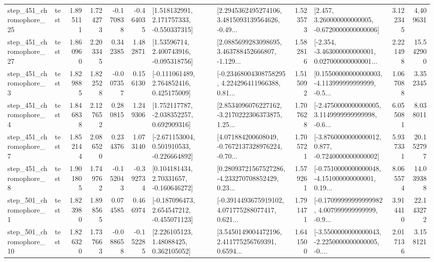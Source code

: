 \begin{tabular}{llrrrrllrlrr}
  step\_451\_chromophore\_25 &      test &      1.895111 &    1.724273 &     -0.170838 & -0.464035 &    [1.518132991, 2.171757333, -0.550337315] &  [2.2945362495274106, 3.4815093139564626, -0.49... &       1.523573 &    [2.457, 3.260000000000005, -0.6720000000000006] &            3.122345 &          4.409631 \\
  step\_451\_chromophore\_27 &      test &      1.860960 &    2.203345 &      0.342385 &  1.482871 &     [1.53596714, 2.400743916, -0.095318756] &  [2.0885699283098695, 3.463788452666807, -1.129... &       1.582816 &  [-2.354, -3.463000000000001, 0.027000000000001... &            2.221498 &         15.542900 \\
   step\_451\_chromophore\_3 &      test &      1.829885 &    1.822528 &     -0.007357 &  0.156130 &    [-0.111061489, 2.764852416, 0.425175009] &  [-0.23468004308758295, 4.224296411966388, 0.81... &       1.515092 &  [0.15500000000000003, -4.113999999999999, -0.5... &            1.067088 &          3.352345 \\
   step\_451\_chromophore\_4 &      test &      1.846838 &    2.127652 &      0.280815 &  1.249306 &    [1.752117787, -2.038352257, 0.692909316] &  [2.8534096076227162, -3.2170222306373875, 1.25... &       1.707628 &  [-2.4750000000000005, 3.1149999999999998, -0.6... &            6.055081 &          8.038011 \\
   step\_451\_chromophore\_7 &      test &      1.852144 &    2.086520 &      0.234376 &  1.073140 &   [-2.671153004, 0.501910533, -0.226664892] &  [4.071884200608049, -0.7672137328976224, -0.70... &       1.705721 &  [-3.8760000000000012, 0.877, -0.7240000000000002] &            5.937331 &         20.152797 \\
   step\_451\_chromophore\_8 &      test &      1.901805 &    1.749762 &     -0.152043 & -0.392734 &     [0.104181434, 2.70331657, -0.160646272] &  [0.28093721567527286, -4.233270708852429, 0.23... &       1.579261 &  [-0.7510000000000048, -4.151000000000001, 0.19... &            8.065574 &         14.039388 \\
   step\_501\_chromophore\_1 &      test &      1.823980 &    1.898565 &      0.074585 &  0.466974 &   [-0.187096473, 2.654547212, -0.455071123] &  [-0.3914493675919102, 4.071775288077417, 0.621... &       1.791471 &  [-0.17099999999999982, 4.007999999999999, -0.9... &            3.914410 &         22.143272 \\
  step\_501\_chromophore\_10 &      test &      1.826320 &    1.737663 &     -0.088658 & -0.152285 &      [2.226105123, 1.48088425, 0.362105052] &  [3.5450149004472196, 2.411775256769391, 0.6594... &       1.641500 &  [-3.5500000000000043, -2.2250000000000005, -0.... &            2.017136 &          3.158121 \\

\end{tabular}
